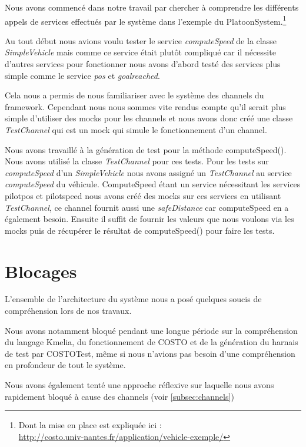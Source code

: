 Nous avons commencé dans notre travail par chercher à comprendre les différents appels de services effectués par le système dans l'exemple du PlatoonSystem.\footnote{Dont la mise en place est expliquée ici :\\ \url{http://costo.univ-nantes.fr/application/vehicle-exemple/}}


Au tout début nous avions voulu tester le service \textit{computeSpeed} de la classe \textit{SimpleVehicle} mais comme ce service était plutôt compliqué car il nécessite d'autres services pour fonctionner nous avons d'abord testé des services plus simple comme le service \textit{pos} et \textit{goalreached}.



Cela nous a permis de nous familiariser avec le système des channels du framework. Cependant nous nous sommes vite rendus compte qu'il serait plus simple d'utiliser des mocks pour les channels et nous avons donc créé une classe \textit{TestChannel} qui est un mock qui simule le fonctionnement d'un channel.


Nous avons travaillé à la génération de test pour la méthode computeSpeed(). Nous avons utilisé la classe \textit{TestChannel} pour ces tests. Pour les tests sur \textit{computeSpeed} d'un \textit{SimpleVehicle} nous avons assigné un \textit{TestChannel} au service \textit{computeSpeed} du véhicule. ComputeSpeed étant un service nécessitant les services pilotpos et pilotspeed nous avons créé des mocks sur ces services en utilisant \textit{TestChannel}, ce channel fournit aussi une \textit{safeDistance} car computeSpeed en a également besoin. Ensuite il suffit de fournir les valeurs que nous voulons via les mocks puis de récupérer le résultat de computeSpeed() pour faire les tests. 


\section{Blocages}
\label{sec:JUnitBlocages}

L'ensemble de l'architecture du système nous a posé quelques soucis de compréhension lors de nos travaux. 

Nous avons notamment bloqué pendant une longue période sur la compréhension du langage Kmelia, du fonctionnement de COSTO et de la génération du harnais de test par COSTOTest, même si nous n'avions pas besoin d'une compréhension en profondeur de tout le système.

Nous avons également tenté une approche réflexive sur laquelle nous avons rapidement bloqué à cause des channels (voir \ref{subsec:channels})

